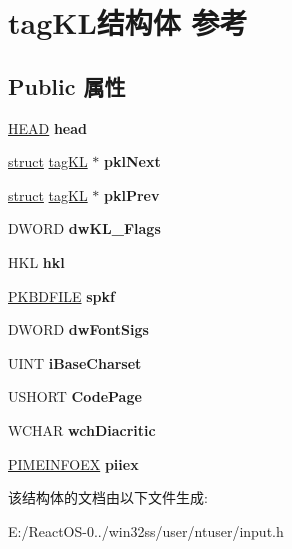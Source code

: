 \hypertarget{structtag_k_l}{}\section{tag\+K\+L结构体 参考}
\label{structtag_k_l}
\subsection*{Public 属性}
\begin{DoxyCompactItemize}
\item 
\mbox{\label{structtag_k_l_ad8b02155616af78ce6370bcc1dd0e157}} 
\hyperlink{struct___h_e_a_d}{H\+E\+AD} {\bfseries head}
\item 
\mbox{\label{structtag_k_l_af26ea52bb5940e1035d763a7997d1d4f}} 
\hyperlink{interfacestruct}{struct} \hyperlink{structtag_k_l}{tag\+KL} $\ast$ {\bfseries pkl\+Next}
\item 
\mbox{\label{structtag_k_l_aff2927169195b37a2395c1e19db96087}} 
\hyperlink{interfacestruct}{struct} \hyperlink{structtag_k_l}{tag\+KL} $\ast$ {\bfseries pkl\+Prev}
\item 
\mbox{\label{structtag_k_l_a111f7b7eec720714fd93a1ccd30446b2}} 
D\+W\+O\+RD {\bfseries dw\+K\+L\+\_\+\+Flags}
\item 
\mbox{\label{structtag_k_l_af15152ee0cf91ec8321053543e56d172}} 
H\+KL {\bfseries hkl}
\item 
\mbox{\label{structtag_k_l_ac242a0c7a4f8b83fb2f6bee45fb65419}} 
\hyperlink{structtag_k_b_d_f_i_l_e}{P\+K\+B\+D\+F\+I\+LE} {\bfseries spkf}
\item 
\mbox{\label{structtag_k_l_a863413a646ce21c3ed68b4f4780d4478}} 
D\+W\+O\+RD {\bfseries dw\+Font\+Sigs}
\item 
\mbox{\label{structtag_k_l_afab739854620187fa4e1b8886805aefb}} 
U\+I\+NT {\bfseries i\+Base\+Charset}
\item 
\mbox{\label{structtag_k_l_a56f91cb32794562ef85d8edc46ead27a}} 
U\+S\+H\+O\+RT {\bfseries Code\+Page}
\item 
\mbox{\label{structtag_k_l_a55610939158caa543ad11a657ca34e23}} 
W\+C\+H\+AR {\bfseries wch\+Diacritic}
\item 
\mbox{\label{structtag_k_l_a726b0fd5bba75ef1dd3b6ef7baf5073c}} 
\hyperlink{structtag_i_m_e_i_n_f_o_e_x}{P\+I\+M\+E\+I\+N\+F\+O\+EX} {\bfseries piiex}
\end{DoxyCompactItemize}


该结构体的文档由以下文件生成\+:\begin{DoxyCompactItemize}
\item 
E\+:/\+React\+O\+S-\/0../win32ss/user/ntuser/input.\+h\end{DoxyCompactItemize}
